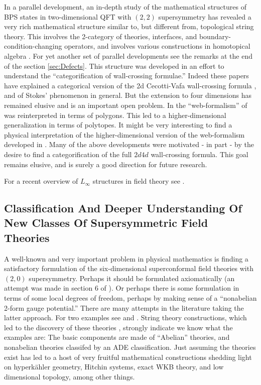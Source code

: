 \documentclass[12pt]{article}
\begin{document}
In a parallel development, an in-depth study of the mathematical
structures of BPS states in two-dimensional QFT with $(2,2)$ supersymmetry
has revealed a very rich mathematical structure similar to, but different
from, topological string theory. This involves the 2-category of theories,
interfaces, and boundary-condition-changing operators,  and involves various constructions in
homotopical algebra \cite{Gaiotto:2015aoa,Gaiotto:2015zna,Kapranov:2014uwa,Kapranov:2020zoa,Khan:2020hir}. For yet another set of parallel developments see the remarks at the end of the section \ref{sec:Defects}. 
This structure was developed in an effort to understand 
the ``categorification of wall-crossing formulae.''
Indeed these papers have explained a categorical version of the 2d Cecotti-Vafa wall-crossing formula 
\cite{Cecotti:1992qh,Cecotti:1992rm}, and of Stokes' phenomenon in general.
But the extension to four dimensions has remained elusive and is an important open problem.
In \cite{Kapranov:2014uwa} the ``web-formalism'' of \cite{Gaiotto:2015aoa,Gaiotto:2015zna} was
reinterpreted in terms of polygons. This led to a higher-dimensional generalization in terms of
polytopes. It might be very interesting to find a physical interpretation of the higher-dimensional 
version of the web-formalism developed in \cite{Kapranov:2014uwa}. Many of the above developments 
were motivated - in part - by the desire to find a categorification 
of the full $2d4d$ wall-crossing formula. This goal remains elusive, and is surely a 
good direction for future research. 

For a recent overview of $L_\infty$ structures in field theory see \cite{Hohm:2017pnh}.







\subsection{Classification And Deeper Understanding Of New Classes Of Supersymmetric Field Theories}

A well-known and very important problem in physical mathematics is
finding a satisfactory formulation of the six-dimensional superconformal
field theories with $(2,0)$ supersymmetry. Perhaps it should be formulated
axiomatically (an attempt was made in section 6 of  \cite{MooreKleinLectures}).
Or  perhaps there is some formulation in terms of some local
degrees of freedom, perhaps by making sense of a ``nonabelian 2-form gauge potential.'' There are many attempts in the literature taking the latter approach. For two examples see  \cite{Lambert:2010wm,Lambert:2010iw,Lambert:2012qy} and 
\cite{Baez:2004in,Fiorenza:2012tb,Fiorenza:2013kqa,Samann:2016ksp}.
String theory constructions, which led to the discovery of these theories
 \cite{Seiberg:1997ax,Strominger:1995ac,Witten:1995zh},
  strongly indicate we know what the examples are:   
  The basic components are made
of ``Abelian'' theories, and nonabelian theories classifed by an ADE classification.
Just assuming the theories exist has led to a host of very fruitful mathematical
constructions shedding light on hyperk\"{a}hler geometry, Hitchin systems, exact WKB theory, and low
dimensional topology, among other things.
\end{document}
